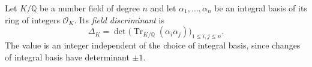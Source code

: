 
Let $K/\mathbb Q$ be a number field of degree $n$ and let $\alpha_1,\ldots,\alpha_n$ be an integral basis of its ring of integers $\mathcal O_K$. Its \emph{field discriminant} is
\[
\Delta_K=\det\bigl(\operatorname{Tr}_{K/\mathbb Q}(\alpha_i\alpha_j)\bigr)_{1\le i,j\le n}.
\]
The value is an integer independent of the choice of integral basis, since changes of integral basis have determinant $\pm1$.
